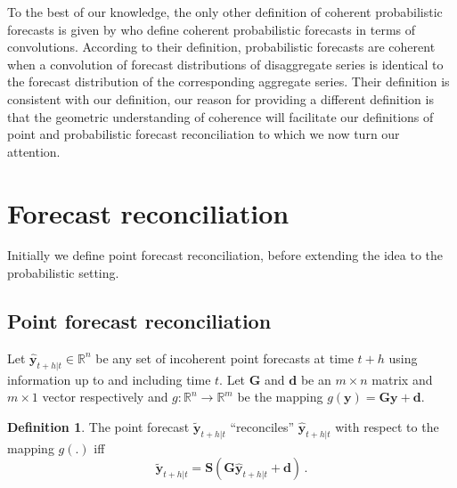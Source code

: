 \documentclass[a4paper, 11pt]{article}
\theoremstyle{theo}
\theoremstyle{definition}
\newtheorem{definition}{Definition}[section]
\begin{document}

To  the best of our knowledge, the only other definition of coherent probabilistic forecasts is given by \citet{BenTaieb2017} who define coherent probabilistic forecasts in terms of convolutions. According to their definition, probabilistic forecasts are coherent when a convolution of forecast distributions of disaggregate series is identical to the forecast distribution of the corresponding aggregate series.  Their definition is consistent with our definition, our reason for providing a different definition is that the geometric understanding of coherence will facilitate our definitions of point and probabilistic forecast reconciliation to which we now turn our attention.

\section{Forecast reconciliation}\label{sec:reconciliation}

Initially we define point forecast reconciliation, before extending the idea to the probabilistic setting.

\subsection{Point forecast reconciliation}


  Let $\hat{\bm{y}}_{t+h|t} \in \mathbb{R}^n$ be any set of incoherent point forecasts at time $t+h$ using information up to and including time $t$.  Let $\bm{G}$ and $\bm{d}$ be an $m\times n$ matrix and $m\times 1$ vector respectively and $g:\mathbb{R}^n \rightarrow \mathbb{R}^m$ be the mapping $g(\bm{y})={\bm G}{\bm y}+{\bm d}$.
  \begin{definition}\label{def:reconpoint}
  The point forecast $\tilde{\bm{y}}_{t+h|t}$ ``reconciles'' $\hat{\bm{y}}_{t+h|t}$ with respect to the mapping $g(.)$ iff
  \begin{equation}
    \tilde{\bm{y}}_{t+h|t}=\bm{S}\left(\bm{G}\hat{\bm{y}}_{t+h|t}+{\bm d}\right)\,.
  \end{equation} 
    
\end{definition}
\end{document}
